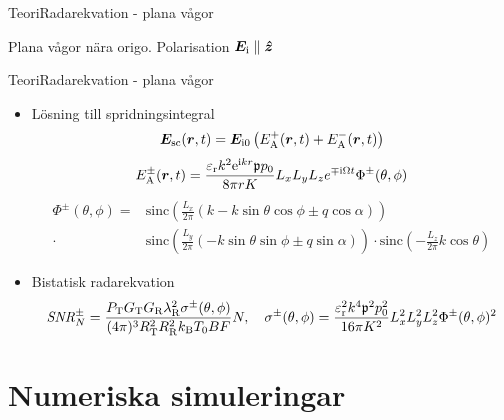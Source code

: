 \documentclass[11pt, final]{beamer}
\begin{document}
	\begin{frame}{Teori}{Radarekvation - plana vågor}
		\resizebox{!}{0.6\textheight}{
			
		}
		
		Plana vågor nära origo. Polarisation $\bm{E}_{\mathrm{i}} \parallel \bm{\hat{z}}$
	\end{frame}
	
	\begin{frame}{Teori}{Radarekvation - plana vågor}
		\begin{itemize}
			\item Lösning till spridningsintegral
			\small
			\begin{equation*}
				\bm{E}_{\mathrm{sc}} (\bm{r},t) = \bm{E}_{\mathrm{i}0} \left( E_{\mathrm{A}}^+ (\bm{r},t) + E_{\mathrm{A}}^- (\bm{r},t) \right)
			\end{equation*}
			\begin{equation*}
				E_{\mathrm{A}}^\pm (\bm{r},t) = \frac{\varepsilon_{\mathrm{r}}k^2 \mathrm{e}^{\mathrm{i} kr} \mathfrak{p} p_0}{8\pi r K} L_{x} L_{y} L_{z} e^{\mp \mathrm{i} \Omega t} \Phi^\pm (\theta,\phi)
			\end{equation*}
			\pause
			\begin{equation*}
			\begin{split}
				\Phi^\pm(\theta,\phi) =& \text{sinc} \left( \frac{L_{x}}{2\pi} \left( k - k\sin{\theta}\cos{\phi} \pm q\cos{\alpha} \right) \right) \\
				\cdot& \text{sinc} \left( \frac{L_{y}}{2\pi} \left( -k\sin{\theta}\sin{\phi} \pm q\sin{\alpha} \right) \right)
				\cdot \text{sinc} \left( -\frac{L_{z}}{2\pi} k\cos{\theta} \right)
			\end{split}
			\end{equation*}
			\pause
			\normalsize
			\item Bistatisk radarekvation
			\small
			\begin{equation*}
				\mathit{SNR}^\pm_N = \frac{P_{\mathrm{T}} G_{\mathrm{T}} G_{\mathrm{R}} \lambda_{\mathrm{R}}^2 \sigma^\pm (\theta,\phi)}{(4\pi)^3 R_{\mathrm{T}}^2 R_{\mathrm{R}}^2 k_{\mathrm{B}} T_0 B F} N, \quad
				\sigma^\pm (\theta, \phi) = \frac{\varepsilon_{\mathrm{r}}^2 k^4 \mathfrak{p}^2 p_0^2}{16\pi K^2} L_{x}^2 L_{y}^2 L_{z}^2 \Phi^\pm (\theta,\phi)^2
			\end{equation*}
		\end{itemize}
	\end{frame}

	\section{Numeriska simuleringar}
	
\end{document}
